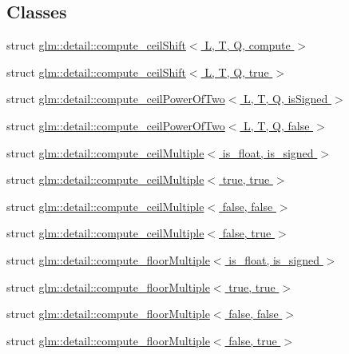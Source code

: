 \subsection*{Classes}
\begin{DoxyCompactItemize}
\item 
struct \hyperlink{structglm_1_1detail_1_1compute__ceilShift}{glm\+::detail\+::compute\+\_\+ceil\+Shift$<$ L, T, Q, compute $>$}
\item 
struct \hyperlink{structglm_1_1detail_1_1compute__ceilShift_3_01L_00_01T_00_01Q_00_01true_01_4}{glm\+::detail\+::compute\+\_\+ceil\+Shift$<$ L, T, Q, true $>$}
\item 
struct \hyperlink{structglm_1_1detail_1_1compute__ceilPowerOfTwo}{glm\+::detail\+::compute\+\_\+ceil\+Power\+Of\+Two$<$ L, T, Q, is\+Signed $>$}
\item 
struct \hyperlink{structglm_1_1detail_1_1compute__ceilPowerOfTwo_3_01L_00_01T_00_01Q_00_01false_01_4}{glm\+::detail\+::compute\+\_\+ceil\+Power\+Of\+Two$<$ L, T, Q, false $>$}
\item 
struct \hyperlink{structglm_1_1detail_1_1compute__ceilMultiple}{glm\+::detail\+::compute\+\_\+ceil\+Multiple$<$ is\+\_\+float, is\+\_\+signed $>$}
\item 
struct \hyperlink{structglm_1_1detail_1_1compute__ceilMultiple_3_01true_00_01true_01_4}{glm\+::detail\+::compute\+\_\+ceil\+Multiple$<$ true, true $>$}
\item 
struct \hyperlink{structglm_1_1detail_1_1compute__ceilMultiple_3_01false_00_01false_01_4}{glm\+::detail\+::compute\+\_\+ceil\+Multiple$<$ false, false $>$}
\item 
struct \hyperlink{structglm_1_1detail_1_1compute__ceilMultiple_3_01false_00_01true_01_4}{glm\+::detail\+::compute\+\_\+ceil\+Multiple$<$ false, true $>$}
\item 
struct \hyperlink{structglm_1_1detail_1_1compute__floorMultiple}{glm\+::detail\+::compute\+\_\+floor\+Multiple$<$ is\+\_\+float, is\+\_\+signed $>$}
\item 
struct \hyperlink{structglm_1_1detail_1_1compute__floorMultiple_3_01true_00_01true_01_4}{glm\+::detail\+::compute\+\_\+floor\+Multiple$<$ true, true $>$}
\item 
struct \hyperlink{structglm_1_1detail_1_1compute__floorMultiple_3_01false_00_01false_01_4}{glm\+::detail\+::compute\+\_\+floor\+Multiple$<$ false, false $>$}
\item 
struct \hyperlink{structglm_1_1detail_1_1compute__floorMultiple_3_01false_00_01true_01_4}{glm\+::detail\+::compute\+\_\+floor\+Multiple$<$ false, true $>$}

\end{DoxyCompactItemize}
